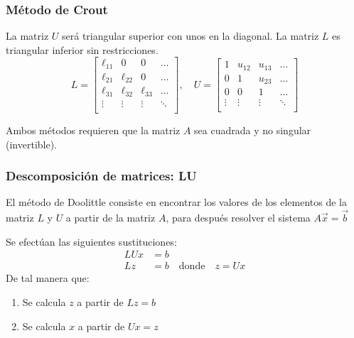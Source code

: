 \subsubsection{Método de Crout}

La matriz \(U\) será triangular superior con unos en la diagonal.
La matriz \(L\) es triangular inferior sin restricciones.
\[
L = \begin{bmatrix}
\ell_{11} & 0 & 0 & \dots \\
\ell_{21} & \ell_{22} & 0 & \dots \\
\ell_{31} & \ell_{32} & \ell_{33} & \dots \\
\vdots & \vdots & \vdots & \ddots \\
\end{bmatrix},
\quad
U = \begin{bmatrix}
1 & u_{12} & u_{13} & \dots \\
0 & 1 & u_{23} & \dots \\
0 & 0 & 1 & \dots \\
\vdots & \vdots & \vdots & \ddots \\
\end{bmatrix}
\]

Ambos métodos requieren que la matriz \(A\) sea cuadrada y no singular (invertible).

\subsubsection{Descomposición de matrices: LU}

El método de Doolittle consiste en encontrar los valores de los elementos de la matriz \(L\) y \(U\) a partir de la matriz \(A\), para después resolver el sistema \(A\vec{x} = \vec{b}\)

Se efectúan las siguientes sustituciones:
\begin{align*}
  LUx &= b \\
  Lz &= b \quad \text{donde} \quad z=Ux
\end{align*}
De tal manera que:
\begin{enumerate}
  \item Se calcula \(z\) a partir de \(Lz=b\)
  \item Se calcula \(x\) a partir de \(Ux=z\)
\end{enumerate}

